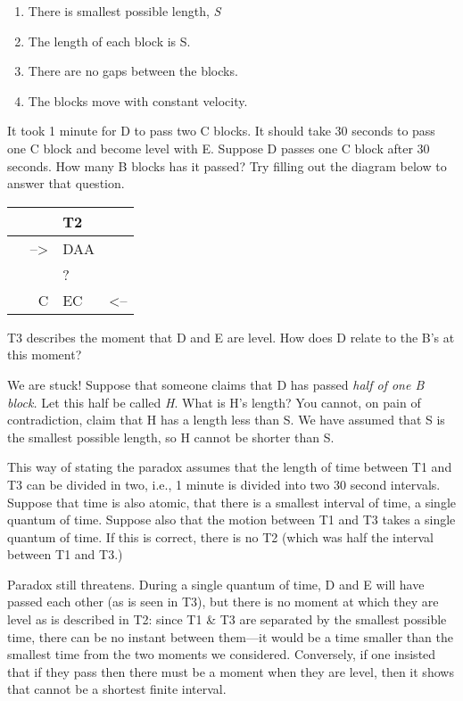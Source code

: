 \documentclass[]{article}
\begin{document}
\begin{enumerate}
\def\labelenumi{\arabic{enumi}.}
\itemsep1pt\parskip0pt
\item
  There is smallest possible length, \emph{S}
\item
  The length of each block is S.
\item
  There are no gaps between the blocks.
\item
  The blocks move with constant velocity.
\end{enumerate}

It took 1 minute for D to pass two C blocks. It should take 30 seconds to
pass one C block and become level with E. Suppose D passes one C block after 30 seconds. How
many B blocks has it passed? Try filling out the diagram below to answer
that question.

\begin{longtable}[c]{@{}rll@{}}
\toprule
& T2 &\tabularnewline
\midrule
\endhead
--\textgreater{} & DAA &\tabularnewline
& ? &\tabularnewline
~ ~ C & EC~ & \textless{}--\tabularnewline
\bottomrule
\end{longtable}

T3 describes the moment that D and E are level. How does D relate to the B's at this moment?

We are stuck! Suppose that someone claims that D has passed \emph{half
of one B block.} Let this half be called \emph{H}. What is H's length?
You cannot, on pain of contradiction, claim that H has a length less
than S. We have assumed that S is the smallest possible length, so H
cannot be shorter than S.

This way of stating the paradox assumes that the length of time between
T1 and T3 can be divided in two, i.e., 1 minute is divided into two 30
second intervals. Suppose that time is also atomic, that there is a
smallest interval of time, a single quantum of time. Suppose also that
the motion between T1 and T3 takes a single quantum of time. If this is
correct, there is no T2 (which was half the interval between T1 and T3.)

Paradox still threatens. During a single quantum of time, D and E will
have passed each other (as is seen in T3), but there is no moment at
which they are level as is described in T2: since T1 \& T3 are
separated by the smallest possible time, there can be no instant between
them---it would be a time smaller than the smallest time from the two
moments we considered. Conversely, if one insisted that if they pass
then there must be a moment when they are level, then it shows that
cannot be a shortest finite interval.
\end{document}
